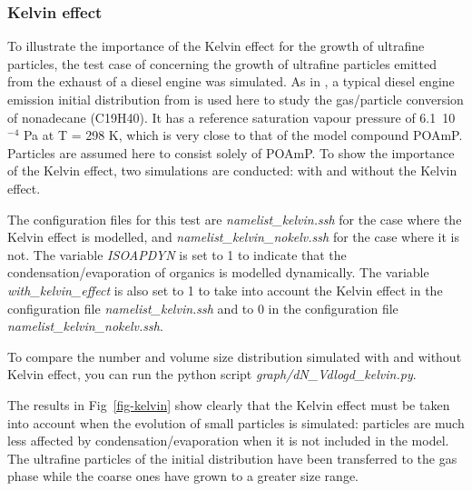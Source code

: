 \documentclass[a4paper,11pt]{article}
\begin{document}
\subsubsection{Kelvin effect}

To illustrate the importance of the Kelvin effect for the growth of ultrafine
particles, the test case of \cite{devilliers13} concerning the growth of
ultrafine particles emitted from the exhaust of a diesel engine was simulated.
As in \cite{devilliers13}, a typical diesel engine emission initial
distribution from \cite{kittelson2006road} is used here to
study the gas/particle conversion of nonadecane (C19H40). It has a
reference saturation vapour pressure of 6.1~10$^{-4}$ Pa at T = 298 K, which is
very close to that of the model compound POAmP.
Particles are assumed here to consist solely of POAmP.
To show the importance of the Kelvin effect, two simulations are conducted:
with and without the Kelvin effect.

The configuration files for this test are {\it{namelist\_kelvin.ssh}} for the
case where the Kelvin effect is modelled, and {\it{namelist\_kelvin\_nokelv.ssh}} for the
case where it is not.
The variable {\it{ISOAPDYN}} is set to 1 to indicate that the
condensation/evaporation of organics is modelled dynamically. The variable
{\it{with\_kelvin\_effect}} is also set to 1 to take into account the Kelvin
effect in the configuration file {\it{namelist\_kelvin.ssh}} and to 0 in the configuration file {\it{namelist\_kelvin\_nokelv.ssh}}.

To compare the number and volume size distribution simulated with and without
Kelvin effect, you can run the python script {\it{graph/dN\_Vdlogd\_kelvin.py}}.

The results in Fig~\ref{fig-kelvin} show clearly that the Kelvin effect must be taken into account when
the evolution of small particles is simulated: particles are much less affected by
condensation/evaporation when it is not included in the model. The ultrafine particles of the initial distribution have been transferred to the gas phase while the coarse ones have grown to a greater size range.
\end{document}
